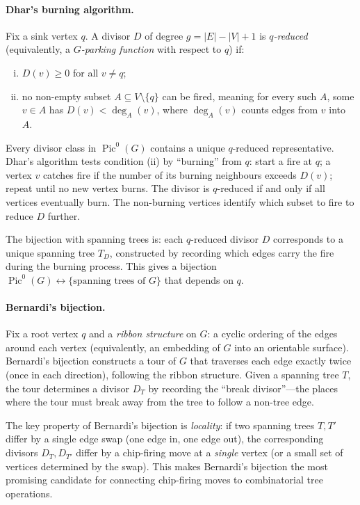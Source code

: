 \documentclass[11pt]{article}
\newcommand{\Pic}{\operatorname{Pic}^0}
\begin{document}
\paragraph{Dhar's burning algorithm.}
Fix a sink vertex $q$. A divisor $D$ of degree $g = |E| - |V| + 1$ is
\emph{$q$-reduced} (equivalently, a \emph{$G$-parking function} with respect
to $q$) if:
\begin{enumerate}[(i)]
  \item $D(v) \geq 0$ for all $v \neq q$;
  \item no non-empty subset $A \subseteq V \setminus \{q\}$ can be fired,
    meaning for every such $A$, some $v \in A$ has $D(v) < \deg_A(v)$, where
    $\deg_A(v)$ counts edges from $v$ into $A$.
\end{enumerate}
Every divisor class in $\Pic(G)$ contains a unique $q$-reduced representative.
Dhar's algorithm tests condition (ii) by ``burning'' from $q$: start a fire at
$q$; a vertex $v$ catches fire if the number of its burning neighbours exceeds
$D(v)$; repeat until no new vertex burns. The divisor is $q$-reduced if and
only if all vertices eventually burn. The non-burning vertices identify which
subset to fire to reduce $D$ further.

The bijection with spanning trees is: each $q$-reduced divisor $D$ corresponds
to a unique spanning tree $T_D$, constructed by recording which edges carry the
fire during the burning process. This gives a bijection
$\Pic(G) \leftrightarrow \{\text{spanning trees of } G\}$ that depends on $q$.

\paragraph{Bernardi's bijection.}
Fix a root vertex $q$ and a \emph{ribbon structure} on $G$: a cyclic ordering
of the edges around each vertex (equivalently, an embedding of $G$ into an
orientable surface). Bernardi's bijection constructs a tour of $G$ that
traverses each edge exactly twice (once in each direction), following the
ribbon structure. Given a spanning tree $T$, the tour determines a divisor
$D_T$ by recording the ``break divisor''---the places where the tour must
break away from the tree to follow a non-tree edge.

The key property of Bernardi's bijection is \emph{locality}: if two spanning
trees $T, T'$ differ by a single edge swap (one edge in, one edge out), the
corresponding divisors $D_T, D_{T'}$ differ by a chip-firing move at a
\emph{single} vertex (or a small set of vertices determined by the swap). This
makes Bernardi's bijection the most promising candidate for connecting
chip-firing moves to combinatorial tree operations.
\end{document}
